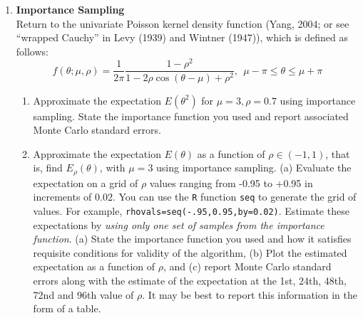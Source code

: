 \documentclass{article}
\begin{document}
\begin{enumerate}
\item {\bf Importance Sampling}\\
Return to the univariate Poisson kernel density function (Yang,
  2004; or see ``wrapped Cauchy'' in Levy (1939) and Wintner (1947)),
  which is defined as follows:
\begin{equation}
  f(\theta;\mu,\rho) = \frac{1}{2\pi} \frac{1-\rho^2}{1-2\rho \cos(\theta-\mu) + \rho^2},\:\: \mu-\pi \leq \theta \leq \mu + \pi
\end{equation}
\begin{enumerate}
\item Approximate the expectation $E(\theta^2)$ for $\mu=3, \rho=0.7$ using importance sampling. State the importance function you used and report associated Monte Carlo standard errors.
\item Approximate the expectation $E(\theta)$ as a function of $\rho \in
  (-1,1)$, that is, find $E_{\rho}(\theta)$, with $\mu=3$ using
  importance sampling. (a) Evaluate the expectation on a grid of
  $\rho$ values ranging from -0.95 to +0.95 in increments of 0.02. You
  can use the {\tt R} function {\tt seq} to generate the grid of
  values.  For example, {\tt rhovals=seq(-.95,0.95,by=0.02)}. Estimate
  these expectations by {\it using only one set of samples from the
    importance function}. (a) State the importance function you used
  and how it satisfies requisite conditions for validity of the
  algorithm, (b) Plot the estimated expectation as a function of
  $\rho$, and (c) report Monte Carlo standard errors along with the
  estimate of the expectation at the 1st, 24th, 48th, 72nd and 96th
  value of $\rho$.  It may be best to report this information in the
  form of a table.
\end{enumerate}


\end{enumerate}
\end{document}
